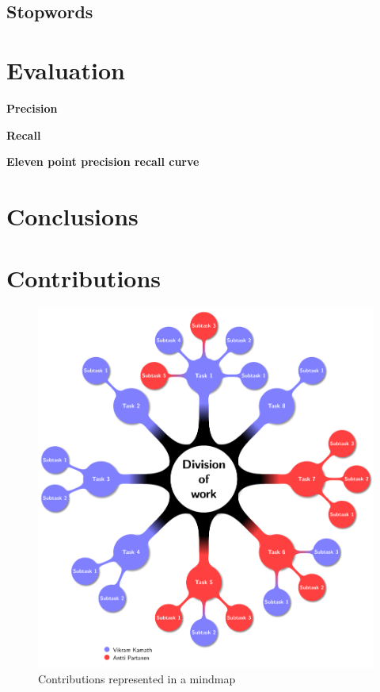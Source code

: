 \subsection{Stopwords}


\section{Evaluation}


\textbf{Precision}

\textbf{Recall}

\textbf{Eleven point precision recall curve}


\section{Conclusions}


\section{Contributions}


\begin{figure}[p]
    \centering
    \includegraphics[scale=0.6]{contributions_tree.pdf}
    \caption{Contributions represented in a mindmap}
    \label{fig:contributions_tree}
\end{figure}
\FloatBarrier

